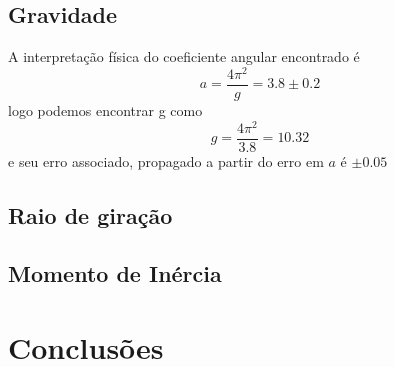 \documentclass[12pt,a4paper]{article}
\begin{document}
\subsection{Gravidade}
A interpretação física do coeficiente angular encontrado é $$ a = \frac{4\pi^2}{g} = 3.8 \pm 0.2$$ logo podemos encontrar g como $$ g = \frac{4\pi^2}{3.8} = 10.32$$ e seu erro associado, propagado a partir do erro em $a$ é $ \pm 0.05 $
\subsection{Raio de giração}
\subsection{Momento de Inércia}




\section{Conclusões}
\end{document}
